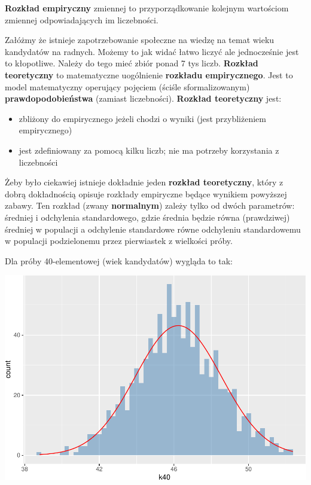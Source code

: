 \documentclass[
  openany]{book}
\begin{document}
\textbf{Rozkład empiryczny} zmiennej to
przyporządkowanie kolejnym wartościom zmiennej odpowiadających im liczebności.

Załóżmy że istnieje zapotrzebowanie społeczne na wiedzę na temat wieku kandydatów
na radnych. Możemy to jak widać łatwo liczyć ale jednocześnie jest to kłopotliwe.
Należy do tego mieć zbiór ponad 7 tys liczb.
\textbf{Rozkład teoretyczny} to matematyczne uogólnienie \textbf{rozkładu empirycznego}.
Jest to model matematyczny operujący pojęciem (ściśle sformalizowanym) \textbf{prawdopodobieństwa}
(zamiast liczebności). \textbf{Rozkład teoretyczny} jest:

\begin{itemize}
\item
  zbliżony do empirycznego jeżeli chodzi o wyniki (jest przybliżeniem empirycznego)
\item
  jest zdefiniowany za pomocą kilku liczb; nie ma potrzeby korzystania z liczebności
\end{itemize}

Żeby było ciekawiej istnieje dokładnie jeden \textbf{rozkład teoretyczny}, który z dobrą dokładnością
opisuje rozkłady empiryczne będące wynikiem powyższej zabawy.
Ten rozkład (zwany \textbf{normalnym})
zależy tylko od dwóch parametrów: średniej i odchylenia standardowego, gdzie średnia będzie
równa (prawdziwej) średniej w populacji a odchylenie standardowe
równe odchyleniu standardowemu w populacji podzielonemu przez pierwiastek z wielkości próby.

Dla próby 40-elementowej (wiek kandydatów) wygląda to tak:

\includegraphics{_main_files/figure-latex/unnamed-chunk-35-1.pdf}
\end{document}
